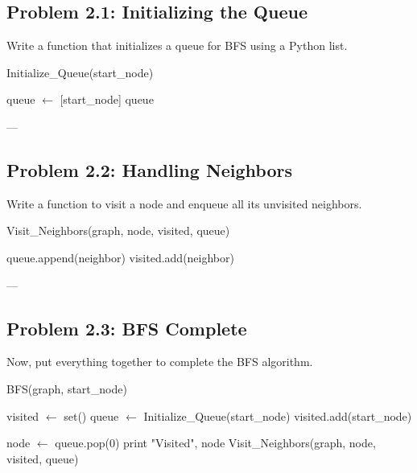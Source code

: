 \documentclass{article}
\begin{document}
\subsection*{Problem 2.1: Initializing the Queue}

Write a function that initializes a queue for BFS using a Python list.

\begin{algorithm}[H]
\caption{Initialize\_Queue(start\_node)}
\begin{algorithmic}
    \STATE queue $\gets$ [start\_node] 
    \RETURN queue
\end{algorithmic}
\end{algorithm}

---

\subsection*{Problem 2.2: Handling Neighbors}

Write a function to visit a node and enqueue all its unvisited neighbors.

\begin{algorithm}[H]
\caption{Visit\_Neighbors(graph, node, visited, queue)}
\begin{algorithmic}
            \STATE queue.append(neighbor) 
            \STATE visited.add(neighbor)
        \ENDIF
    \ENDFOR
\end{algorithmic}
\end{algorithm}

---

\subsection*{Problem 2.3: BFS Complete}

Now, put everything together to complete the BFS algorithm.

\begin{algorithm}[H]
\caption{BFS(graph, start\_node)}
\begin{algorithmic}
    \STATE visited $\gets$ set() 
    \STATE queue $\gets$ Initialize\_Queue(start\_node)
    \STATE visited.add(start\_node)
    
        \STATE node $\gets$ queue.pop(0) 
        \STATE print "Visited", node
        \STATE Visit\_Neighbors(graph, node, visited, queue)
    \ENDWHILE
\end{algorithmic}
\end{algorithm}
\end{document}
